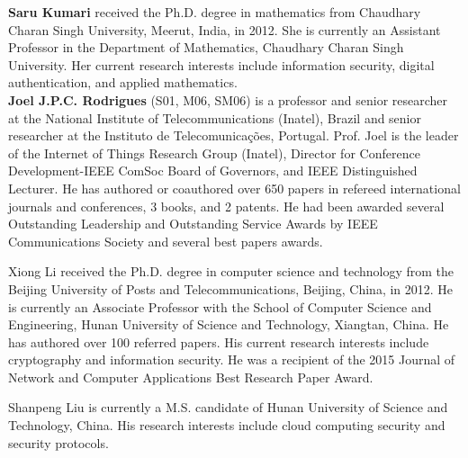 \documentclass[IEEE JOURNAL OF BIOMEDICAL AND HEALTH INFORMATICS]{IEEEtran}
\begin{document}
\noindent\textbf{Saru Kumari} received the Ph.D. degree in mathematics from Chaudhary Charan Singh University, Meerut, India, in 2012. She is currently an Assistant Professor in the
Department of Mathematics, Chaudhary Charan Singh University. Her current research interests include information security, digital authentication, and applied mathematics.\\

\noindent\textbf{Joel J.P.C. Rodrigues} (S01, M06, SM06) is a professor and senior researcher at the National Institute of Telecommunications (Inatel), Brazil and senior researcher at the Instituto de Telecomunica\c{c}\~oes, Portugal. Prof. Joel is the leader of the Internet of Things Research Group (Inatel), Director for Conference Development-IEEE ComSoc Board of Governors, and IEEE Distinguished Lecturer. He has authored or coauthored over 650 papers in refereed international journals and conferences, 3 books, and 2 patents. He had been awarded several Outstanding Leadership and Outstanding Service Awards by IEEE Communications Society and several best papers awards.




\vspace{-1cm}
\begin{IEEEbiography}{Xiong Li}
received the Ph.D. degree in computer science and technology from the Beijing University of Posts and Telecommunications, Beijing, China, in 2012. He is currently an Associate Professor with the School of Computer Science and Engineering, Hunan University of Science and Technology, Xiangtan, China. He has authored over 100 referred papers. His current research interests include cryptography and information security. He was a recipient of the 2015 Journal of Network and Computer Applications Best Research Paper Award.
\end{IEEEbiography}

\vspace{-1.5cm}
\begin{IEEEbiography}{Shanpeng Liu}
 is currently a M.S. candidate of Hunan University of Science and Technology, China. His research interests include cloud computing security and security protocols.
\end{IEEEbiography}
\vspace{-1.5cm}
\end{document}
